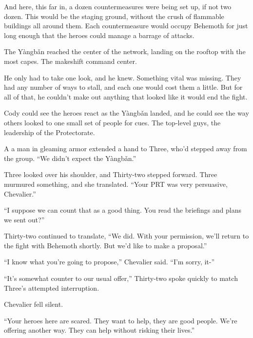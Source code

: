 And here, this far in, a dozen countermeasures were being set up, if not two dozen.  This would be the staging ground, without the crush of flammable buildings all around them.  Each countermeasure would occupy Behemoth for just long enough that the heroes could manage a barrage of attacks.



The Y\`{a}ngb\v{a}n reached the center of the network, landing on the rooftop with the most capes.  The makeshift command center.



He only had to take one look, and he knew.  Something vital was missing.  They had any number of ways to stall, and each one would cost them a little.  But for all of that, he couldn't make out anything that looked like it would end the fight.



Cody could see the heroes react as the Y\`{a}ngb\v{a}n landed, and he could see the way others looked to one small set of people for cues.  The top-level guys, the leadership of the Protectorate.



A a man in gleaming armor extended a hand to Three, who'd stepped away from the group.  ``We didn't expect the Y\`{a}ngb\v{a}n.''



Three looked over his shoulder, and Thirty-two stepped forward.  Three murmured something, and she translated.  ``Your PRT was very persuasive, Chevalier.''



``I suppose we can count that as a good thing.  You read the briefings and plans we sent out?''



Thirty-two continued to translate, ``We did.  With your permission, we'll return to the fight with Behemoth shortly.  But we'd like to make a proposal.''



``I know what you're going to propose,'' Chevalier said.  ``I'm sorry, it-''



``It's somewhat counter to our usual offer,'' Thirty-two spoke quickly to match Three's attempted interruption.



Chevalier fell silent.



``Your heroes here are scared.  They want to help, they are good people.  We're offering another way.  They can help without risking their lives.''



